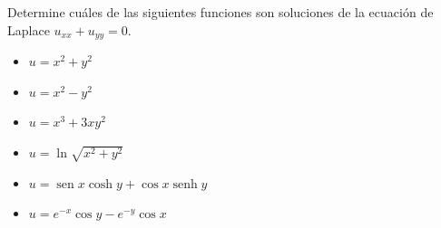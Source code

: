 \item Determine cuáles de las siguientes funciones son soluciones de la ecuación de Laplace $u_{xx} + u_{yy} = 0$.
\begin{itemize}
    \item[(a)] $u = x^2 + y^2$
    \item[(b)] $u = x^2 - y^2$
    \item[(c)] $u = x^3 + 3xy^2$
    \item[(d)] $u = \ln\sqrt{x^2+y^2}$
    \item[(e)] $u = \operatorname{sen} x \cosh y + \cos x \operatorname{senh} y$
    \item[(f)] $u = e^{-x} \cos y - e^{-y} \cos x$
\end{itemize}
